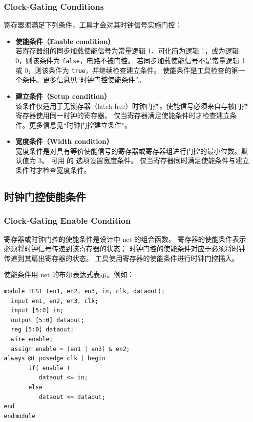 \subsubsection*{Clock-Gating Conditions}

寄存器须满足下列条件，工具才会对其时钟信号实施门控：
\begin{itemize}
  \item \textbf{使能条件（Enable condition）}\\
    若寄存器组的同步加载使能信号为常量逻辑 1、可化简为逻辑 1，或为逻辑 0，则该条件为 \texttt{false}，电路不被门控。
    若同步加载使能信号不是常量逻辑 1 或 0，则该条件为 \texttt{true}，并继续检查建立条件。
    使能条件是工具检查的第一个条件。更多信息见“时钟门控使能条件”。
  \item \textbf{建立条件（Setup condition）}\\
    该条件仅适用于无锁存器（latch-free）时钟门控。使能信号必须来自与被门控寄存器使用同一时钟的寄存器。
    仅当寄存器满足使能条件时才检查建立条件。更多信息见“时钟门控建立条件”。
  \item \textbf{宽度条件（Width condition）}\\
    宽度条件是对具有等价使能信号的寄存器或寄存器组进行门控的最小位数。默认值为 3。
    可用  的  选项设置宽度条件。
    仅当寄存器同时满足使能条件与建立条件时才检查宽度条件。
\end{itemize}

\subsection{时钟门控使能条件}
\subsubsection*{Clock-Gating Enable Condition}

寄存器或时钟门控的使能条件是设计中 net 的组合函数。
寄存器的使能条件表示必须将时钟信号传递到该寄存器的状态；
时钟门控的使能条件对应于必须将时钟传递到其扇出寄存器的状态。
工具使用寄存器的使能条件进行时钟门控插入。

使能条件用 net 的布尔表达式表示。例如：
\begin{lstlisting}[caption={使能条件 Verilog 示例}]
module TEST (en1, en2, en3, in, clk, dataout);
  input en1, en2, en3, clk;
  input [5:0] in;
  output [5:0] dataout;
  reg [5:0] dataout;
  wire enable;
  assign enable = (en1 | en3) & en2;
always @( posedge clk ) begin
       if( enable )
          dataout <= in;
       else
          dataout <= dataout;
end
endmodule
\end{lstlisting}

